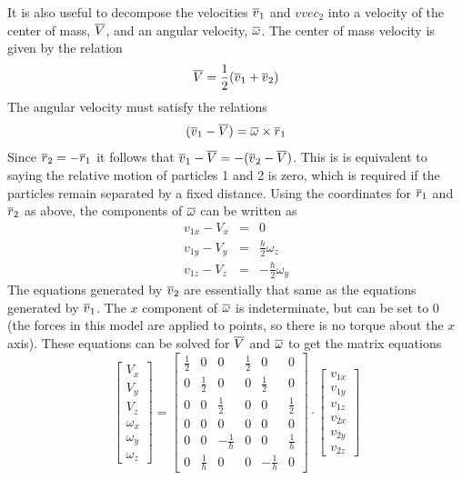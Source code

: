 \documentclass[12pt]{article}
\begin{document}
It is also useful to decompose the velocities $\overline{v}_1$ and $vvec_2$ into a velocity
of the center of mass, $\overline{V}$, and an angular velocity, $\overline{\omega}$. The center of mass
velocity is given by the relation
\[
\overline{V} = \frac{1}{2}(\overline{v}_1+\overline{v}_2)
\]
The angular velocity must satisfy the relations
\[
(\overline{v}_1-\overline{V}) = \overline{\omega}\times\overline{r}_1
\]
Since $\overline{r}_2=-\overline{r}_1$ it follows that $\overline{v}_1-\overline{V}=-(\overline{v}_2-\overline{V})$. This is
is equivalent to saying the relative motion of particles 1 and 2 is zero, which is
required if the particles remain separated by a fixed distance. Using the
coordinates for $\overline{r}_1$ and $\overline{r}_2$ as above, the components of $\overline{\omega}$ can be
written as
\begin{eqnarray*}
v_{1x}-V_x & = & 0 \\
v_{1y}-V_y & = & \frac{h}{2} \omega_z \\
v_{1z}-V_z & = & -\frac{h}{2} \omega_y
\end{eqnarray*}
The equations generated by $\overline{v}_2$ are essentially that same as the equations
generated by $\overline{v}_1$. The $x$ component of $\overline{\omega}$ is indeterminate, but can be
set to 0 (the forces in this model are applied to points, so there is no torque
about the $x$ axis). These equations can be solved for $\overline{V}$ and $\overline{\omega}$ to get
the matrix equations
\[
\left[\begin{array}{c}V_x \\ V_y \\ V_z \\ \omega_x \\ \omega_y \\ \omega_z
 \end{array}\right] =
\left[\begin{array}{cccccc}
\frac{1}{2} & 0 & 0 & \frac{1}{2} & 0 & 0 \\
0 & \frac{1}{2} & 0 & 0 & \frac{1}{2} & 0 \\
0 & 0 & \frac{1}{2} & 0 & 0 & \frac{1}{2} \\
0 & 0 & 0 & 0 & 0 & 0 \\
0 & 0 & -\frac{1}{h} & 0 & 0 & \frac{1}{h} \\
0 & \frac{1}{h} & 0 & 0  &-\frac{1}{h} & 0
\end{array}\right]\cdot
\left[\begin{array}{c} v_{1x} \\ v_{1y} \\ v_{1z} \\ v_{2x} \\ v_{2y} \\ v_{2z}
\end{array}\right]
\]
\end{document}

